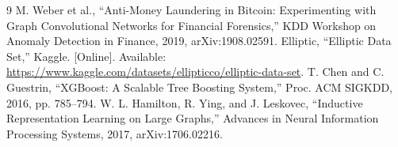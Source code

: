 \documentclass[conference]{IEEEtran}
\begin{document}
\begin{thebibliography}{9}
 M. Weber et al., ``Anti-Money Laundering in Bitcoin: Experimenting with Graph Convolutional Networks for Financial Forensics,'' KDD Workshop on Anomaly Detection in Finance, 2019, arXiv:1908.02591.
 Elliptic, ``Elliptic Data Set,'' Kaggle. [Online]. Available: \url{https://www.kaggle.com/datasets/ellipticco/elliptic-data-set}.
 T. Chen and C. Guestrin, ``XGBoost: A Scalable Tree Boosting System,'' Proc. ACM SIGKDD, 2016, pp. 785--794.
 W. L. Hamilton, R. Ying, and J. Leskovec, ``Inductive Representation Learning on Large Graphs,'' Advances in Neural Information Processing Systems, 2017, arXiv:1706.02216.
\end{thebibliography}
\end{document}

